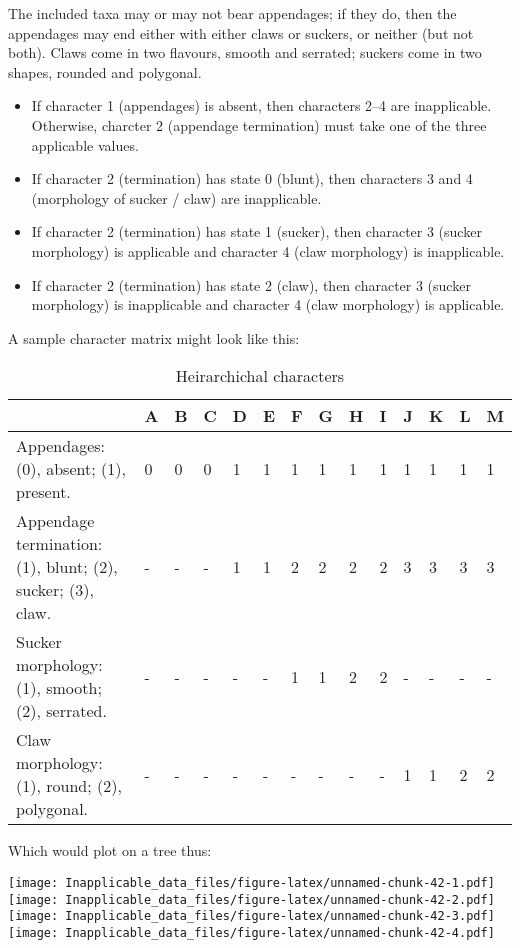 \documentclass[]{book}
\theoremstyle{definition}
\theoremstyle{definition}
\theoremstyle{definition}
\theoremstyle{remark}
\begin{document}
The included taxa may or may not bear appendages; if they do, then the
appendages may end either with either claws or suckers, or neither (but
not both). Claws come in two flavours, smooth and serrated; suckers come
in two shapes, rounded and polygonal.

\begin{itemize}
\item
  If character 1 (appendages) is absent, then characters 2--4 are
  inapplicable. Otherwise, charcter 2 (appendage termination) must take
  one of the three applicable values.
\item
  If character 2 (termination) has state 0 (blunt), then characters 3
  and 4 (morphology of sucker / claw) are inapplicable.
\item
  If character 2 (termination) has state 1 (sucker), then character 3
  (sucker morphology) is applicable and character 4 (claw morphology) is
  inapplicable.
\item
  If character 2 (termination) has state 2 (claw), then character 3
  (sucker morphology) is inapplicable and character 4 (claw morphology)
  is applicable.
\end{itemize}

A sample character matrix might look like this:

\begin{table}

\caption{\label{tab:unnamed-chunk-41}Heirarchichal characters}
\centering
\begin{tabular}[t]{l|l|l|l|l|l|l|l|l|l|l|l|l|l}
\hline
  & A & B & C & D & E & F & G & H & I & J & K & L & M\\
\hline
Appendages: (0), absent; (1), present. & 0 & 0 & 0 & 1 & 1 & 1 & 1 & 1 & 1 & 1 & 1 & 1 & 1\\
\hline
Appendage termination: (1), blunt; (2), sucker; (3), claw. & - & - & - & 1 & 1 & 2 & 2 & 2 & 2 & 3 & 3 & 3 & 3\\
\hline
Sucker morphology: (1), smooth; (2), serrated. & - & - & - & - & - & 1 & 1 & 2 & 2 & - & - & - & -\\
\hline
Claw morphology: (1), round; (2), polygonal. & - & - & - & - & - & - & - & - & - & 1 & 1 & 2 & 2\\
\hline
\end{tabular}
\end{table}

Which would plot on a tree thus:

\texttt{[image: Inapplicable\_data\_files/figure-latex/unnamed-chunk-42-1.pdf]}
\texttt{[image: Inapplicable\_data\_files/figure-latex/unnamed-chunk-42-2.pdf]}
\texttt{[image: Inapplicable\_data\_files/figure-latex/unnamed-chunk-42-3.pdf]}
\texttt{[image: Inapplicable\_data\_files/figure-latex/unnamed-chunk-42-4.pdf]}
\end{document}
